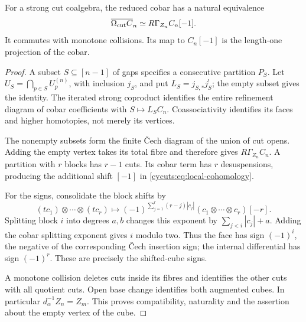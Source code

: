 \begin{theorem}\label{cycuts:thm:support}
For a strong cut coalgebra, the reduced cobar has a natural equivalence
\begin{equation}\label{cycuts:eq:local-cohomology}
 \overline{\Omega_{\mathrm{cut}} C}_n\simeq R\Gamma_{Z_n}C_n[-1].
\end{equation}
It commutes with monotone collisions. Its map to $C_n[-1]$ is the
length-one projection of the cobar.
\end{theorem}
\begin{proof}
A subset $S\subseteq[n-1]$ of gaps specifies a consecutive partition
$P_S$. Let $U_S=\bigcap_{p\in S}U_p^{(n)}$, with inclusion $j_S$,
and put $L_S=j_{S,*}j_S^!$; the empty subset gives the identity.
The iterated strong coproduct identifies the entire refinement diagram
of cobar coefficients with $S\mapsto L_SC_n$. Coassociativity
identifies its faces and higher homotopies, not merely its vertices.

The nonempty subsets form the finite \v Cech diagram of the union
of cut opens. Adding the empty vertex takes its total fibre and
therefore gives $R\Gamma_{Z_n}C_n$. A partition with $r$ blocks
has $r-1$ cuts. Its cobar term has $r$ desuspensions, producing
the additional shift $[-1]$ in \eqref{cycuts:eq:local-cohomology}.

For the signs, consolidate the block shifts by
\begin{equation}\label{cycuts:eq:consolidation}
 (tc_1)\otimes\cdots\otimes(tc_r)\longmapsto
 (-1)^{\sum_{j=1}^r(r-j)|c_j|}
       (c_1\otimes\cdots\otimes c_r)[-r].
\end{equation}
Splitting block $i$ into degrees $a,b$ changes this exponent by
$\sum_{j<i}|c_j|+a$. Adding the cobar splitting exponent gives
$i$ modulo two. Thus the face has sign $(-1)^i$, the negative
of the corresponding \v Cech insertion sign; the internal differential
has sign $(-1)^r$. These are precisely the shifted-cube signs.

A monotone collision deletes cuts inside its fibres and identifies
the other cuts with all quotient cuts. Open base change identifies
both augmented cubes. In particular $d_\alpha^{-1}Z_n=Z_m$.
This proves compatibility, naturality and the assertion about the
empty vertex of the cube.
\end{proof}

